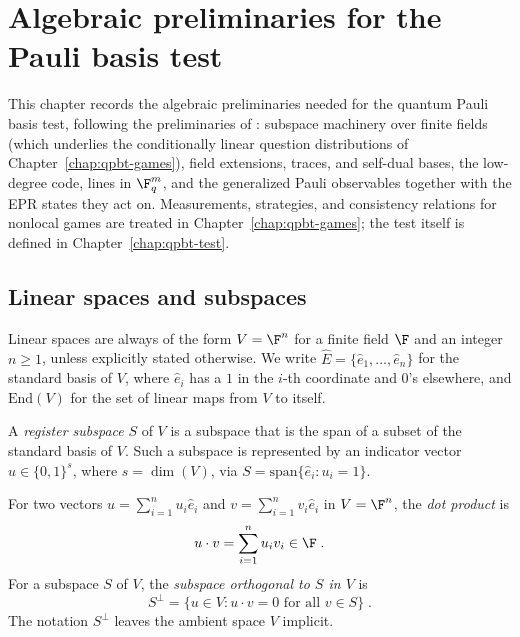 \chapter{Algebraic preliminaries for the Pauli basis test}
\label{chap:qpbt-algebra}

This chapter records the algebraic preliminaries needed for the quantum Pauli
basis test, following the preliminaries of \cite{Ji2020MIPStar}: subspace
machinery over finite fields (which underlies the conditionally linear question
distributions of Chapter~\ref{chap:qpbt-games}), field extensions, traces, and
self-dual bases, the low-degree code, lines in $\F_q^m$, and the generalized
Pauli observables together with the EPR states they act on. Measurements,
strategies, and consistency relations for nonlocal games are treated in
Chapter~\ref{chap:qpbt-games}; the test itself is defined in
Chapter~\ref{chap:qpbt-test}.

\section{Linear spaces and subspaces}
\label{sec:linear-spaces}

Linear spaces are always of the form $V = \F^n$ for a finite field $\F$ and an
integer $n \ge 1$, unless explicitly stated otherwise. We write $\hat{E} =
\{\hat{e}_1, \dots, \hat{e}_n\}$ for the standard basis of $V$, where
$\hat{e}_i$ has a $1$ in the $i$-th coordinate and $0$'s elsewhere, and
$\mathrm{End}(V)$ for the set of linear maps from $V$ to itself.

\begin{definition}\label{def:register-subspace}
	\leanok
	A \emph{register subspace} $S$ of $V$ is a subspace that is the span of a
	subset of the standard basis of $V$. Such a subspace is represented by an
	indicator vector $u \in \{0,1\}^s$, where $s = \dim(V)$, via
	$S = \mathrm{span}\{\hat{e}_i : u_i = 1\}$.
\end{definition}

\begin{definition}\label{def:dot-product-orthogonal}
	\leanok
	For two vectors $u = \sum_{i=1}^n u_i \hat{e}_i$ and
	$v = \sum_{i=1}^n v_i \hat{e}_i$ in $V = \F^n$, the \emph{dot product} is
	\[
		u \cdot v = \sum_{i=1}^n u_i v_i \in \F\;.
	\]
	For a subspace $S$ of $V$, the \emph{subspace orthogonal to $S$ in $V$} is
	\[
		S^\perp = \bigl\{ u \in V : u \cdot v = 0 \text{ for all } v \in S \bigr\}\;.
	\]
	The notation $S^\perp$ leaves the ambient space $V$ implicit.
\end{definition}

